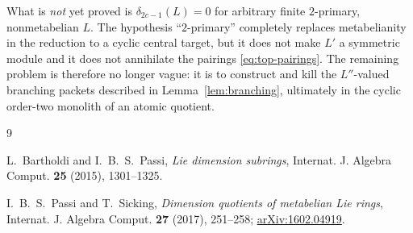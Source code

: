 \documentclass[a4paper,11pt,reqno]{amsart}
\theoremstyle{definition}
\theoremstyle{remark}
\newcommand{\dlt}{\delta}
\begin{document}
What is \emph{not} yet proved is
\(\dlt_{2c-1}(L)=0\) for arbitrary finite $2$-primary, nonmetabelian $L$.
The hypothesis ``$2$-primary'' completely replaces metabelianity in the
reduction to a cyclic central target, but it does not make $L'$ a symmetric
module and it does not annihilate the pairings \eqref{eq:top-pairings}.  The
remaining problem is therefore no longer vague: it is to construct and kill
the $L''$-valued branching packets described in
Lemma~\ref{lem:branching}, ultimately in the cyclic order-two monolith of an
atomic quotient.

\begin{thebibliography}{9}

L.~Bartholdi and I.~B.~S.~Passi,
\emph{Lie dimension subrings},
Internat. J. Algebra Comput. \textbf{25} (2015), 1301--1325.

I.~B.~S.~Passi and T.~Sicking,
\emph{Dimension quotients of metabelian Lie rings},
Internat. J. Algebra Comput. \textbf{27} (2017), 251--258;
\href{https://arxiv.org/abs/1602.04919}{arXiv:1602.04919}.

\end{thebibliography}
\end{document}
